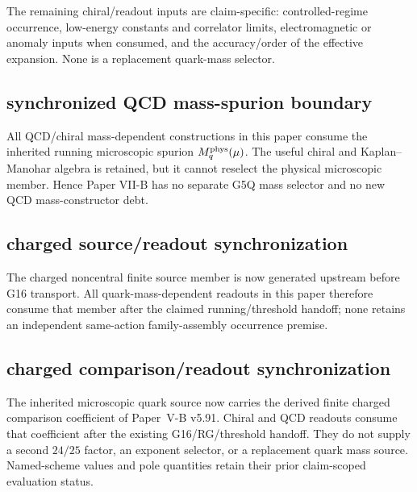 \documentclass[12pt,a4paper]{article}
\begin{document}
The remaining chiral/readout inputs are claim-specific: controlled-regime
occurrence, low-energy constants and correlator limits, electromagnetic or
anomaly inputs when consumed, and the accuracy/order of the effective
expansion.  None is a replacement quark-mass selector.


\subsection{synchronized QCD mass-spurion boundary}
\label{p11:sec:v155-safeguard-qcd-mass-spurion}
All QCD/chiral mass-dependent constructions in this paper consume the inherited
running microscopic spurion \(M_q^{\rm phys}(\mu)\).  The useful chiral and
Kaplan--Manohar algebra is retained, but it cannot reselect the physical
microscopic member.  Hence Paper VII-B has no separate G5Q mass selector and no
new QCD mass-constructor debt.


\subsection{charged source/readout synchronization}
\label{p11:sec:v157-charged-source-sync}
The charged noncentral finite source member is now generated upstream before
G16 transport.  All quark-mass-dependent readouts in this paper therefore
consume that member after the claimed running/threshold handoff; none retains
an independent same-action family-assembly occurrence premise.




\subsection{charged comparison/readout synchronization}
\label{p11:sec:v158-charged-comparison-sync}
The inherited microscopic quark source now carries the derived finite charged
comparison coefficient of Paper~V-B v5.91.  Chiral and QCD readouts consume
that coefficient after the existing G16/RG/threshold handoff.  They do not
supply a second $24/25$ factor, an exponent selector, or a replacement quark
mass source.  Named-scheme values and pole quantities retain their prior
claim-scoped evaluation status.
\end{document}
